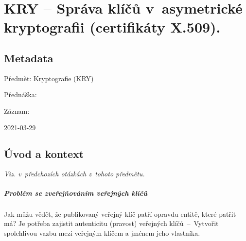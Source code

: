 

\graphicspath{{kry/sprava_klicu_v_asymetricke}}


\chapter{KRY -- Správa klíčů v~asymetrické kryptografii (certifikáty X.509).}


\section{Metadata}

\begin{compactitem}
    \item Předmět: Kryptografie (KRY)
    \item Přednáška:
    \begin{compactitem}
        \item {}
    \end{compactitem}
    \item Záznam:
    \begin{compactitem}
        \item 2021-03-29
    \end{compactitem}
\end{compactitem}


\section{Úvod a kontext}

\textit{Viz.  v~předchozích otázkách z~tohoto předmětu.}

\paragraph*{Problém se zveřejňováním veřejných klíčů} Jak můžu vědět, že publikovaný veřejný klíč patří opravdu entitě, které patřit má? Je potřeba zajistit autenticitu (pravost) veřejných klíčů~--~Vytvořit spolehlivou vazbu mezi veřejným klíčem a jménem jeho vlastníka.

